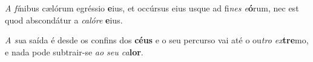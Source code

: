 \begin{greenumerate}
  \switchcolumn*


  \item \textit{A fí}nibus cælórum egréssio \textbf{e}ius, {\GreDagger} et occúrsus eius usque ad fi\textit{nes e}\textbf{ó}rum, {\GreStar} nec est quod abscondátur a \textit{calóre} \textbf{e}ius. 

  \switchcolumn%

  \item \textit{A su}a saída é desde os confins dos \textbf{céus} {\GreDagger} e o seu percurso vai até o ou\textit{tro ex}\textbf{tre}mo, {\GreStar} e nada pode subtrair-se \textit{ao seu ca}\textbf{lor}. 

\end{greenumerate}